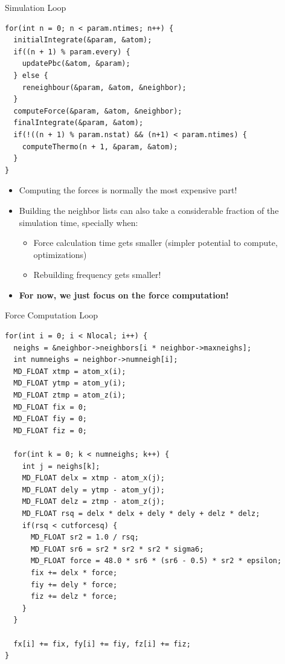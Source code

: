 \documentclass[aspectratio=169,t]{beamer}
\begin{document}
  \begin{frame}[fragile]{Simulation Loop}
    \begin{lstlisting}
for(int n = 0; n < param.ntimes; n++) {
  initialIntegrate(&param, &atom);
  if((n + 1) % param.every) {
    updatePbc(&atom, &param);
  } else {
    reneighbour(&param, &atom, &neighbor);
  }
  computeForce(&param, &atom, &neighbor);
  finalIntegrate(&param, &atom);
  if(!((n + 1) % param.nstat) && (n+1) < param.ntimes) {
    computeThermo(n + 1, &param, &atom);
  }
}
    \end{lstlisting}
    \begin{itemize}
      \item Computing the forces is normally the most expensive part!
      \item Building the neighbor lists can also take a considerable fraction of the simulation time, specially when:
      \begin{itemize}
        \item Force calculation time gets smaller (simpler potential to compute, optimizations)
        \item Rebuilding frequency gets smaller!
      \end{itemize}
      \item \textbf{For now, we just focus on the force computation!}
    \end{itemize}
  \end{frame}

  \begin{frame}[fragile]{Force Computation Loop}
    \vspace{-15.5pt}
    \begin{lstlisting}[basicstyle=\tt\tiny]
for(int i = 0; i < Nlocal; i++) {
  neighs = &neighbor->neighbors[i * neighbor->maxneighs];
  int numneighs = neighbor->numneigh[i];
  MD_FLOAT xtmp = atom_x(i);
  MD_FLOAT ytmp = atom_y(i);
  MD_FLOAT ztmp = atom_z(i);
  MD_FLOAT fix = 0;
  MD_FLOAT fiy = 0;
  MD_FLOAT fiz = 0;

  for(int k = 0; k < numneighs; k++) {
    int j = neighs[k];
    MD_FLOAT delx = xtmp - atom_x(j);
    MD_FLOAT dely = ytmp - atom_y(j);
    MD_FLOAT delz = ztmp - atom_z(j);
    MD_FLOAT rsq = delx * delx + dely * dely + delz * delz;
    if(rsq < cutforcesq) {
      MD_FLOAT sr2 = 1.0 / rsq;
      MD_FLOAT sr6 = sr2 * sr2 * sr2 * sigma6;
      MD_FLOAT force = 48.0 * sr6 * (sr6 - 0.5) * sr2 * epsilon;
      fix += delx * force;
      fiy += dely * force;
      fiz += delz * force;
    }
  }

  fx[i] += fix, fy[i] += fiy, fz[i] += fiz;
}
    \end{lstlisting}
  \end{frame}
\end{document}
